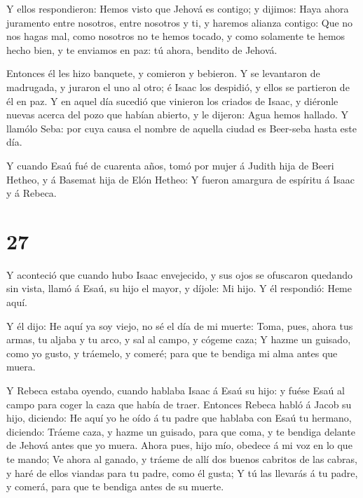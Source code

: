  Y ellos respondieron: Hemos visto que Jehová es contigo; y
dijimos: Haya ahora juramento entre nosotros, entre nosotros y ti, y
haremos alianza contigo:  Que no nos hagas mal, como
nosotros no te hemos tocado, y como solamente te hemos hecho bien, y te
enviamos en paz: tú ahora, bendito de Jehová.

 Entonces él les hizo banquete, y comieron y bebieron.
 Y se levantaron de madrugada, y juraron el uno al otro; é
Isaac los despidió, y ellos se partieron de él en paz.  Y
en aquel día sucedió que vinieron los criados de Isaac, y diéronle
nuevas acerca del pozo que habían abierto, y le dijeron: Agua hemos
hallado.  Y llamólo Seba: por cuya causa el nombre de
aquella ciudad es Beer-seba hasta este día.

 Y cuando Esaú fué de cuarenta años, tomó por mujer á
Judith hija de Beeri Hetheo, y á Basemat hija de Elón Hetheo:
 Y fueron amargura de espíritu á Isaac y á Rebeca.

\hypertarget{section-26}{%
\section{27}\label{section-26}}

 Y aconteció que cuando hubo Isaac envejecido, y sus ojos se
ofuscaron quedando sin vista, llamó á Esaú, su hijo el mayor, y díjole:
Mi hijo. Y él respondió: Heme aquí.

 Y él dijo: He aquí ya soy viejo, no sé el día de mi muerte:
 Toma, pues, ahora tus armas, tu aljaba y tu arco, y sal al
campo, y cógeme caza;  Y hazme un guisado, como yo gusto, y
tráemelo, y comeré; para que te bendiga mi alma antes que muera.

 Y Rebeca estaba oyendo, cuando hablaba Isaac á Esaú su
hijo: y fuése Esaú al campo para coger la caza que había de traer.
 Entonces Rebeca habló á Jacob su hijo, diciendo: He aquí yo
he oído á tu padre que hablaba con Esaú tu hermano, diciendo:
 Tráeme caza, y hazme un guisado, para que coma, y te
bendiga delante de Jehová antes que yo muera.  Ahora pues,
hijo mío, obedece á mi voz en lo que te mando;  Ve ahora al
ganado, y tráeme de allí dos buenos cabritos de las cabras, y haré de
ellos viandas para tu padre, como él gusta;  Y tú las
llevarás á tu padre, y comerá, para que te bendiga antes de su muerte.

